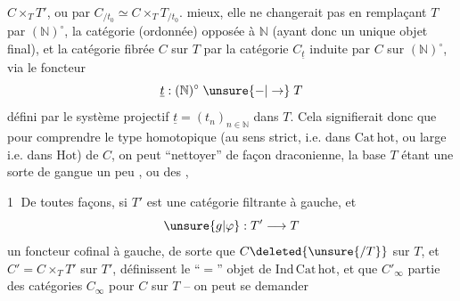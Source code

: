 
$C\times_T T'$, ou par $C_{/t_0}\simeq C\times_T T_{/t_0}$.   mieux, elle ne changerait pas en remplaçant $T$ par $(\mathbb N)^\circ$, la catégorie (ordonnée) opposée à $\mathbb N$ (ayant donc un unique objet final), et la catégorie fibrée $C$ sur $T$ par la catégorie $C_{\underline t}$ induite par $C$ sur $(\mathbb N)^\circ$, via le foncteur
\[
\underline t:(\mathbb N)^\circ\mathrel{\unsure{-|\to}}T
\]
défini par le système projectif $\underline t=(t_n)_{n\in\mathbb N}$ dans $T$. Cela signifierait donc que pour comprendre le type homotopique (au sens strict, i.e. dans $\mathrm{Cat\,hot}$, ou large i.e. dans $\mathrm{Hot}$) de $C$, on peut  ``nettoyer'' de façon draconienne, la base $T$ étant  une sorte de gangue un peu , ou des  ,

\textcircled{1} De toutes façons, si $T'$ est une  catégorie filtrante à gauche, et
\[
\unsure{g|\varphi}:T'\longrightarrow T
\]
un foncteur cofinal à gauche,  de sorte que $C\deleted{\unsure{/T}}$ sur $T$, et $C'=C\times_T T'$ sur $T'$, définissent  le ``$=$'' objet de $\mathrm{Ind\,Cat\,hot}$, et que  $C'_\infty$   partie des catégories $C_\infty$ pour $C$ sur $T$ -- on peut se demander

